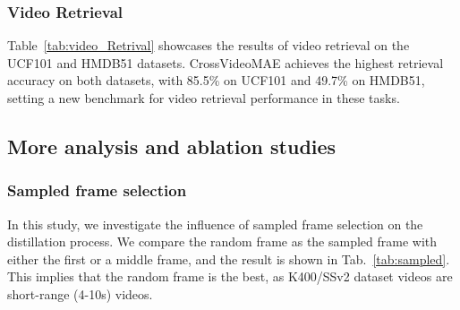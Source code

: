 \subsubsection{Video Retrieval}

Table~\ref{tab:video_Retrival} showcases the results of video retrieval on the UCF101 and HMDB51 datasets. CrossVideoMAE achieves the highest retrieval accuracy on both datasets, with 85.5\% on UCF101 and 49.7\% on HMDB51, setting a new benchmark for video retrieval performance in these tasks.











\subsection{More analysis and ablation studies}

\subsubsection{Sampled frame selection}

In this study, we investigate the influence of sampled frame selection on the distillation process. We compare the random frame as the sampled frame with either the first or a middle frame, and the result is shown in Tab.~\ref{tab:sampled}. This implies that the random frame is the best, as K400/SSv2 dataset videos are short-range (4-10s) videos.

\begin{table}[h!]
\centering
\scriptsize
{}

\caption{\textbf{Sampled frame selection.} We perform an ablation study on SSv2 to select the sampled frame as the first, middle, or random frame}
\label{tab:sampled}
\end{table}

